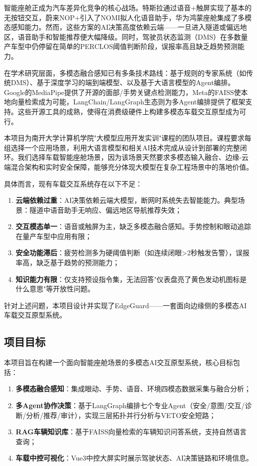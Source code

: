 \documentclass[a4paper]{article}
\begin{document}
智能座舱正成为汽车差异化竞争的核心战场。特斯拉通过语音+触屏实现了基本的无按钮交互，蔚来NOP+引入了NOMI拟人化语音助手，华为鸿蒙座舱集成了多模态感知能力。然而，这些方案的AI决策高度依赖云端——一旦进入隧道或偏远地区，语音助手和智能推荐便大幅降级。同时，驾驶员状态监测（DMS）在多数量产车型中仍停留在简单的PERCLOS阈值判断阶段，误报率高且缺乏趋势预测能力。

在学术研究层面，多模态融合感知已有多条技术路线：基于规则的专家系统（如传统DMS）、基于深度学习的端到端模型、以及基于大语言模型的Agent编排。Google的MediaPipe提供了开源的面部/手势关键点检测能力，Meta的FAISS使本地向量检索成为可能，LangChain/LangGraph生态则为多Agent编排提供了框架支持。这些开源工具的成熟，使得在消费级硬件上构建多模态车载交互原型成为可行。

本项目为南开大学计算机学院"大模型应用开发实训"课程的团队项目。课程要求每组选择一个应用场景，利用大语言模型和相关AI技术完成从设计到部署的完整闭环。我们选择车载智能座舱场景，因为该场景天然要求多模态输入融合、边缘-云端混合架构和实时安全保障，能够充分体现大模型在复杂工程场景中的落地价值。

具体而言，现有车载交互系统存在以下不足：
\begin{enumerate}
    \item \textbf{云端依赖过重}：AI决策依赖云端大模型，断网时系统失去智能能力。典型场景：隧道中语音助手无响应、偏远地区导航推荐失效；
    \item \textbf{交互模态单一}：语音或触屏为主，缺乏多模态融合感知。手势控制和眼动追踪在量产车型中应用有限；
    \item \textbf{安全功能滞后}：疲劳检测多为硬阈值判断（如连续闭眼>2秒触发告警），误报率高，缺乏基于趋势的预测能力；
    \item \textbf{知识能力有限}：仅支持预设指令集，无法回答"仪表盘亮了黄色发动机图标是什么意思"等开放性问题。
\end{enumerate}

针对上述问题，本项目设计并实现了EdgeGuard——一套面向边缘侧的多模态AI车载交互原型系统。

\subsection{项目目标}

本项目旨在构建一个面向智能座舱场景的多模态AI交互原型系统，核心目标包括：

\begin{enumerate}

    \item \textbf{多模态融合感知}：集成眼动、手势、语音、环境四模态数据采集与融合分析；
    \item \textbf{多Agent协作决策}：基于LangGraph编排七个专业Agent（安全/意图/交互/诊断/分析/推荐/审计），实现三层拓扑并行分析与VETO安全短路；
    \item \textbf{RAG车辆知识库}：基于FAISS向量检索的车辆知识问答系统，支持自然语言查询；
    \item \textbf{车载中控可视化}：Vue3中控大屏实时展示驾驶状态、AI决策链路和环境信息。
\end{enumerate}
\end{document}
